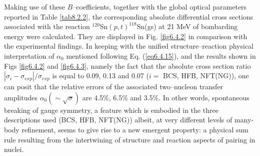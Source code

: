 Making use of these $B$--coefficients, together with the global optical parameters reported in Table \ref{tab8.2.2}, the corresponding absolute differential cross sections associated with the reaction $^{120}$Sn$(p,t)^{118}$Sn(gs) at 21 MeV of bombarding energy were calculated. They are displayed in Fig. \ref{fig6.4.2} in comparison with the experimental findings. In keeping with the unified structure--reaction physical interpretation of $\alpha_0$ mentioned following Eq. (\ref{eq6.4.15}), and 
the results shown in Figs \ref{fig6.4.2} and \ref{fig6.4.3}, namely the fact that the absolute cross section ratio $|\sigma_i-\sigma_{exp}|/\sigma_{exp}$ is equal to 0.09, 0.13 and 0.07 ($i=$ BCS, HFB, NFT(NG)), one can posit that the relative errors of the associated two--nucleon transfer amplitudes $\alpha_0(\sim\sqrt{\sigma})$ are 4.5\%, 6.5\% and 3.5\%. In other words, spontaneous breaking of gauge symmetry, a feature which is embodied in the three descriptions used (BCS, HFB, NFT(NG)) albeit, at very different levels of many-body refinement, seems to give rise to a new emergent property: a physical sum rule resulting from the intertwining of structure and reaction aspects of pairing in nuclei. 

